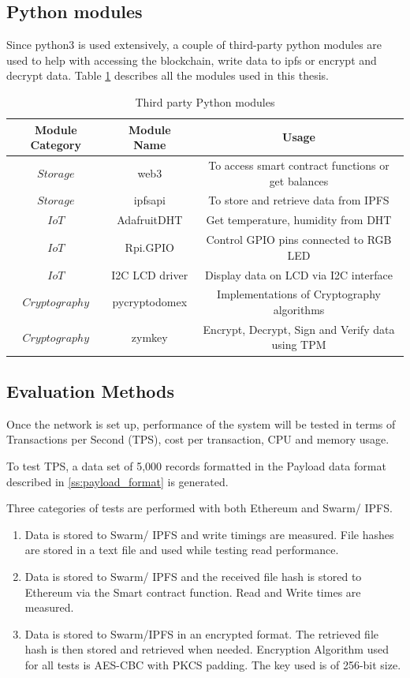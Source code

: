 \documentclass[11pt,openright]{report}
\begin{document}
\subsection{Python modules}
Since python3 is used extensively, a couple of third-party python modules are used to help with accessing the blockchain, write data to ipfs or encrypt and decrypt data. Table \ref{python_modules} describes all the modules used in this thesis.
\begin{table}[!htbp]
    \renewcommand{\arraystretch}{1.3}
    \caption{Third party Python modules}
    \label{python_modules}
    \centering
    \begin{tabular}{|c|c|c|}
        \hline
        \bfseries Module Category & \bfseries Module Name & \bfseries Usage \\
        \hline\hline
        $Storage$ & web3 & To access smart contract functions or get balances \\ \hline
        $Storage$ & ipfsapi & To store and retrieve data from IPFS \\ \hline
        $IoT$ & AdafruitDHT & Get temperature, humidity from DHT \\ \hline
        $IoT$ & Rpi.GPIO & Control GPIO pins connected to RGB LED \\ \hline
        $IoT$ & I2C LCD driver & Display data on LCD via I2C interface \\ \hline
        $Cryptography$ & pycryptodomex & Implementations of Cryptography algorithms \\ \hline
        $Cryptography$ & zymkey & Encrypt, Decrypt, Sign and Verify data using TPM \\ \hline
    \end{tabular}
\end{table}

\subsection{Evaluation Methods}
Once the network is set up, performance of the system will be tested in terms of Transactions per Second (TPS), cost per transaction, CPU and memory usage.

To test TPS, a data set of 5,000 records formatted in the Payload data format described in \ref{ss:payload_format} is generated.

Three categories of tests are performed with both Ethereum and Swarm/ IPFS.
\begin{enumerate}
    \item Data is stored to Swarm/ IPFS and write timings are measured. File hashes are stored in a text file and used while testing read performance.
    \item Data is stored to Swarm/ IPFS and the received file hash is stored to Ethereum via the Smart contract function. Read and Write times are measured.
    \item Data is stored to Swarm/IPFS in an encrypted format. The retrieved file hash is then stored and retrieved when needed. Encryption Algorithm used for all tests is AES-CBC with PKCS padding. The key used is of 256-bit size.
\end{enumerate}
\end{document}
